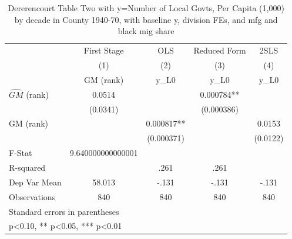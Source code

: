 \begin{table}[htbp]\centering
\def\sym#1{\ifmmode^{#1}\else\(^{#1}\)\fi}
\caption{Dererencourt Table Two with y=Number of Local Govts, Per Capita (1,000) by decade in County 1940-70, with baseline y, division FEs, and mfg and black mig share}
\begin{tabular}{l*{4}{c}}
\toprule
                    & First Stage   &         OLS   &Reduced Form   &        2SLS   \\
                    &\multicolumn{1}{c}{(1)}&\multicolumn{1}{c}{(2)}&\multicolumn{1}{c}{(3)}&\multicolumn{1}{c}{(4)}\\
                    &\multicolumn{1}{c}{GM  (rank)}&\multicolumn{1}{c}{y\_L0}&\multicolumn{1}{c}{y\_L0}&\multicolumn{1}{c}{y\_L0}\\
\midrule
$\hat{GM}$ (rank)   &      0.0514   &               &    0.000784** &               \\
                    &    (0.0341)   &               &  (0.000386)   &               \\
\addlinespace
GM  (rank)          &               &    0.000817** &               &      0.0153   \\
                    &               &  (0.000371)   &               &    (0.0122)   \\
\midrule
F-Stat              &9.640000000000001   &               &               &               \\
R-squared           &               &        .261   &        .261   &               \\
Dep Var Mean        &      58.013   &       -.131   &       -.131   &       -.131   \\
Observations        &         840   &         840   &         840   &         840   \\
\bottomrule
\multicolumn{5}{l}{\footnotesize Standard errors in parentheses}\\
\multicolumn{5}{l}{\footnotesize * p<0.10, ** p<0.05, *** p<0.01}\\
\end{tabular}
\end{table}
